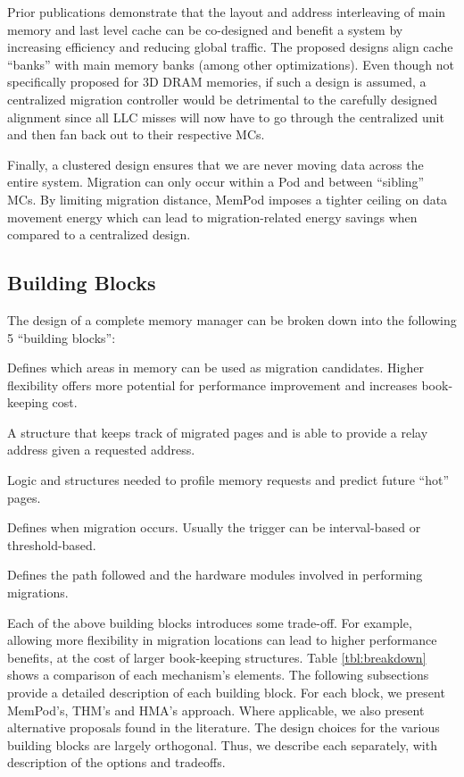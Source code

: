 Prior publications \cite{loh-isca08} demonstrate that the layout and address interleaving of main memory and last level cache can be co-designed and benefit a system by increasing efficiency and reducing global traffic. The proposed designs align cache ``banks'' with main memory banks (among other optimizations). Even though not specifically proposed for 3D DRAM memories, if such a design is assumed, a centralized migration controller would be detrimental to the carefully designed alignment since all LLC misses will now have to go through the centralized unit and then fan back out to their respective MCs.

Finally, a clustered design ensures that we are never moving data across the entire system. Migration can only occur within a Pod and between ``sibling'' MCs. By limiting migration distance, MemPod imposes a tighter ceiling on data movement energy which can lead to migration-related energy savings when compared to a centralized design.


\subsection{Building Blocks}

The design of a complete memory manager can be broken down into the following 5 ``building blocks'':
\begin{description}[style=unboxed,leftmargin=0cm]
\setlength\itemsep{0em}
\item [Migration flexibility:] Defines which areas in memory can be used as migration candidates. Higher flexibility offers more potential for performance improvement and increases book-keeping cost.
\item [Remap table:] A structure that keeps track of migrated pages and is able to provide a relay address given a requested address.
\item [Activity tracking:] Logic and structures needed to profile memory requests and predict future ``hot'' pages.
\item [Migration trigger:] Defines when migration occurs. Usually the trigger can be interval-based or threshold-based.
\item [Migration driver/datapath:] Defines the path followed and the hardware modules involved in performing migrations.
\end{description}

Each of the above building blocks introduces some trade-off. For example, allowing more flexibility in migration locations can lead to higher performance benefits, at the cost of larger book-keeping structures. Table \ref{tbl:breakdown} shows a comparison of each mechanism's elements. The following subsections provide a detailed description of each building block. For each block, we present MemPod's, THM's and HMA's approach. Where applicable, we also present alternative proposals found in the literature. The design choices for the various building blocks are largely
orthogonal.  Thus, we describe each separately, with description of the options
and tradeoffs.

